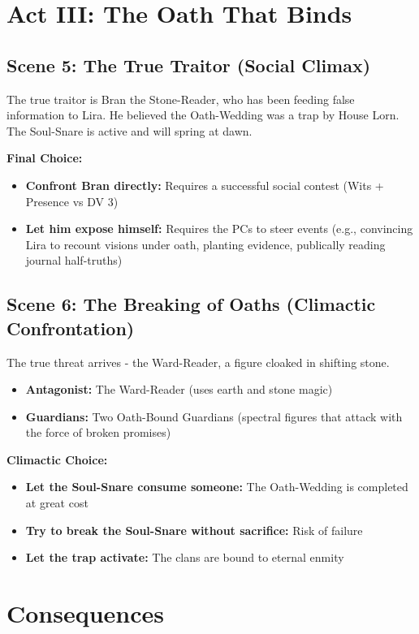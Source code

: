 \documentclass[11pt]{article}
\begin{document}
\section*{Act III: The Oath That Binds}

\subsection*{Scene 5: The True Traitor (Social Climax)}
The true traitor is Bran the Stone-Reader, who has been feeding false information to Lira. He believed the Oath-Wedding was a trap by House Lorn. The Soul-Snare is active and will spring at dawn.

\textbf{Final Choice:}
\begin{itemize}
    \item \textbf{Confront Bran directly:} Requires a successful social contest (Wits + Presence vs DV 3)
    \item \textbf{Let him expose himself:} Requires the PCs to steer events (e.g., convincing Lira to recount visions under oath, planting evidence, publically reading journal half-truths)
\end{itemize}

\subsection*{Scene 6: The Breaking of Oaths (Climactic Confrontation)}
The true threat arrives - the Ward-Reader, a figure cloaked in shifting stone.

\begin{itemize}
    \item \textbf{Antagonist:} The Ward-Reader (uses earth and stone magic)
    \item \textbf{Guardians:} Two Oath-Bound Guardians (spectral figures that attack with the force of broken promises)
\end{itemize}

\textbf{Climactic Choice:}
\begin{itemize}
    \item \textbf{Let the Soul-Snare consume someone:} The Oath-Wedding is completed at great cost
    \item \textbf{Try to break the Soul-Snare without sacrifice:} Risk of failure
    \item \textbf{Let the trap activate:} The clans are bound to eternal enmity
\end{itemize}

\section*{Consequences}
\end{document}
